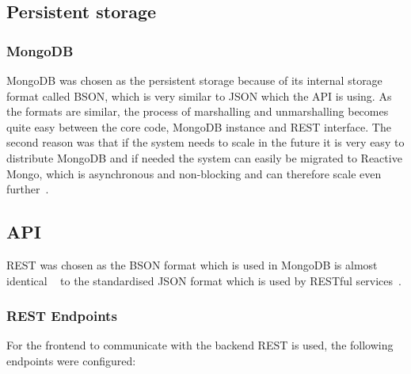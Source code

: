 \documentclass[a4paper,12pt]{article}
\begin{document}
\subsection{Persistent storage}
\subsubsection{MongoDB}
MongoDB was chosen as the persistent storage because of its internal storage format called BSON, which is very similar to JSON 
which the API is using. As the formats are similar, the process of marshalling and unmarshalling becomes quite easy between 
the core code, MongoDB instance and REST interface. The second reason was that if the system needs to scale in the future it 
is very easy to distribute MongoDB and if needed the system can easily be migrated to Reactive Mongo, which is asynchronous and 
non-blocking and can therefore scale even further~\cite{REACTIVEMONGO}.

\subsection{API}
REST was chosen as the BSON format which is used in MongoDB is almost identical ~\cite{BSON} to the standardised JSON 
format which is used by RESTful services~\cite{JSON}. 

\subsubsection{REST Endpoints}
For the frontend to communicate with the backend REST is used, the following endpoints were configured:
\end{document}
